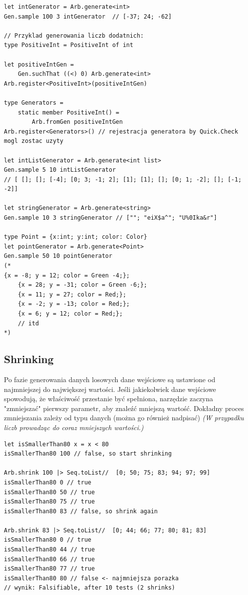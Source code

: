 \lstset{language=FSharp, basicstyle=\scriptsize\ttfamily}
\begin{lstlisting}[frame=single,caption={Przykład generatora dla liczb dodatnich},label=kod:listingA]
let intGenerator = Arb.generate<int>
Gen.sample 100 3 intGenerator  // [-37; 24; -62]

// Przyklad generowania liczb dodatnich:
type PositiveInt = PositiveInt of int

let positiveIntGen =
    Gen.suchThat ((<) 0) Arb.generate<int>
Arb.register<PositiveInt>(positiveIntGen)

type Generators =
    static member PositiveInt() =
        Arb.fromGen positiveIntGen
Arb.register<Generators>() // rejestracja generatora by Quick.Check mogl zostac uzyty

let intListGenerator = Arb.generate<int list>
Gen.sample 5 10 intListGenerator 
// [ []; []; [-4]; [0; 3; -1; 2]; [1]; [1]; []; [0; 1; -2]; []; [-1; -2]]

let stringGenerator = Arb.generate<string>
Gen.sample 10 3 stringGenerator // [""; "eiX$a^"; "U%0Ika&r"]

type Point = {x:int; y:int; color: Color}
let pointGenerator = Arb.generate<Point>
Gen.sample 50 10 pointGenerator
(*
{x = -8; y = 12; color = Green -4;};
    {x = 28; y = -31; color = Green -6;};
    {x = 11; y = 27; color = Red;};
    {x = -2; y = -13; color = Red;};
    {x = 6; y = 12; color = Red;};
    // itd
*)
\end{lstlisting}

\subsection{Shrinking}

Po fazie generowania danych losowych dane wejściowe są ustawione od najmniejszej do największej wartości. Jeśli jakiekolwiek dane wejściowe spowodują, że właściwość przestanie być spełniona, narzędzie zaczyna "zmniejszać" pierwszy parametr, aby znaleźć mniejszą wartość. Dokładny proces zmniejszania zależy od typu danych (można go również nadpisać) \textit{(W przypadku liczb prowadząc do coraz mniejszych wartości.)}

\lstset{language=FSharp, basicstyle=\scriptsize}
\begin{lstlisting}[frame=single,caption={Przykład shrinking na liczbach},label=kod:listingA]
let isSmallerThan80 x = x < 80
isSmallerThan80 100 // false, so start shrinking

Arb.shrink 100 |> Seq.toList//  [0; 50; 75; 83; 94; 97; 99]
isSmallerThan80 0 // true
isSmallerThan80 50 // true
isSmallerThan80 75 // true
isSmallerThan80 83 // false, so shrink again

Arb.shrink 83 |> Seq.toList//  [0; 44; 66; 77; 80; 81; 83]
isSmallerThan80 0 // true
isSmallerThan80 44 // true
isSmallerThan80 66 // true
isSmallerThan80 77 // true
isSmallerThan80 80 // false <- najmniejsza porazka
// wynik: Falsifiable, after 10 tests (2 shrinks)
\end{lstlisting}

